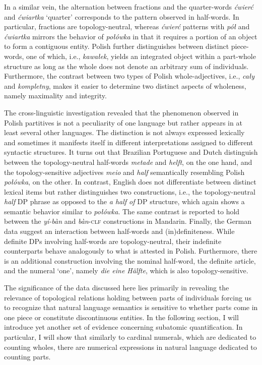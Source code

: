 In a similar vein, the alternation between fractions and the quarter-words \textit{ćwierć} and \textit{ćwiartka} `quarter' corresponds to the pattern observed in half-words. In particular, fractions are topology-neutral, whereas \textit{ćwierć} patterns with \textit{pół} and \textit{ćwiartka} mirrors the behavior of \textit{połówka} in that it requires a portion of an object to form a contiguous entity. Polish further distinguishes between distinct piece-words, one of which, i.e., \textit{kawałek}, yields an integrated object within a part-whole structure as long as the whole does not denote an arbitrary sum of individuals. Furthermore, the contrast between two types of Polish whole-adjectives, i.e., \textit{cały} and \textit{kompletny}, makes it easier to determine two distinct aspects of wholeness, namely maximality and integrity.

The cross-linguistic investigation revealed that the phenomenon observed in Polish partitives is not a peculiarity of one language but rather appears in at least several other languages. The distinction is not always expressed lexically and sometimes it manifests itself in different interpretations assigned to different syntactic structures. It turns out that Brazilian Portuguese and Dutch distinguish between the topology-neutral half-words \textit{metade} and \textit{helft}, on the one hand, and the topology-sensitive adjectives \textit{meio} and \textit{half} semantically resembling Polish \textit{połówka}, on the other. In contrast, English does not differentiate between distinct lexical items but rather distinguishes two constructions, i.e., the topology-neutral \textit{half} DP phrase as opposed to the \textit{a half of} DP structure, which again shows a semantic behavior similar to \textit{połówka}. The same contrast is reported to hold between the \textit{y{\'{i}}-b{\`{a}}n} and \textit{b{\`{a}}n}-\textsc{clf} constructions in Mandarin. Finally, the German data suggest an interaction between half-words and (in)definiteness. While definite DPs involving half-words are topology-neutral, their indefinite counterparts behave analogously to what is attested in Polish. Furthermore, there is an additional construction involving the nominal half-word, the definite article, and the numeral `one', namely \textit{die eine Hälfte}, which is also topology-sensitive.

The significance of the data discussed here lies primarily in revealing the relevance of topological relations holding between parts of individuals forcing us to recognize that natural language semantics is sensitive to whether parts come in one piece or constitute discontinuous entities. In the following section, I will introduce yet another set of evidence concerning subatomic quantification. In particular, I will show that similarly to cardinal numerals, which are dedicated to counting wholes, there are numerical expressions in natural language dedicated to counting parts.
